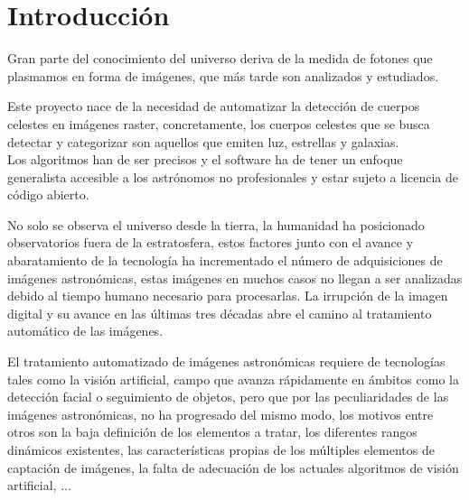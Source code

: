 	\newpage
	\tableofcontents
	\newpage
	
	\section{Introducción}
	
	Gran parte del conocimiento del universo deriva de la medida de fotones que plasmamos en forma de imágenes, que más tarde son analizados y estudiados. 
	
	Este proyecto nace de la necesidad de automatizar la detección de cuerpos celestes en imágenes raster, concretamente, los cuerpos celestes que se busca detectar y categorizar son aquellos que emiten luz, estrellas y galaxias. \\
	Los algoritmos han de ser precisos y el software ha de tener un enfoque generalista accesible a los astrónomos no profesionales y estar sujeto a licencia de código abierto.
	
	No solo se observa el universo desde la tierra, la humanidad ha posicionado observatorios fuera de la estratosfera, estos factores junto con el avance y abaratamiento de la tecnología ha incrementado el número de adquisiciones de imágenes astronómicas, estas imágenes en muchos casos no llegan a ser analizadas debido al tiempo humano necesario para procesarlas. La irrupción de la imagen digital y su avance en las últimas tres décadas abre el camino al tratamiento automático de las imágenes.
	
	El tratamiento automatizado de imágenes astronómicas requiere de tecnologías tales como la visión artificial, campo que avanza rápidamente en ámbitos como la detección facial o seguimiento de objetos, pero que por las peculiaridades de las imágenes astronómicas, no ha progresado del mismo modo, los motivos entre otros son la baja definición de los elementos a tratar, los diferentes rangos dinámicos existentes, las características propias de los múltiples elementos de captación de imágenes, la falta de adecuación de los actuales algoritmos de visión artificial, ...
	
